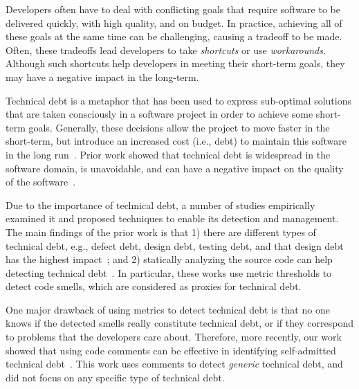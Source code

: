 
Developers often have to deal with conflicting goals that require software to be delivered quickly, with high quality, and on budget. In practice, achieving all of these goals at the same time can be challenging, causing a tradeoff to be made. Often, these tradeoffs lead developers to take \emph{shortcuts} or use \emph{workarounds}. Although such shortcuts help developers in meeting their short-term goals, they may have a negative impact in the long-term.

Technical debt is a metaphor that has been used to express sub-optimal solutions that are taken consciously in a software project in order to achieve some short-term goals. Generally, these decisions allow the project to move faster in the short-term, but introduce an increased cost (i.e., debt) to maintain this software in the long run~\cite{Seaman2011,Kruchten2013IWMTD}. Prior work showed that technical debt is widespread in the software domain, is unavoidable, and can have a negative impact on the quality of the software~\cite{Lim2012Software}.

Due to the importance of technical debt, a number of studies empirically examined it and proposed techniques to enable its detection and management. The main findings of the prior work is that 1) there are different types of technical debt, e.g., defect debt, design debt, testing debt, and that design debt has the highest impact~\cite{Alves2014MTD,Marinescu2012IBM}; and 2) statically analyzing the source code can help detecting technical debt~\cite{Marinescu2004ICSM,Marinescu2010CSMR,Zazworka2013CSE}. In particular, these works use metric thresholds to detect code smells, which are considered as proxies for technical debt. 

One major drawback of using metrics to detect technical debt is that no one knows if the detected smells really constitute technical debt, or if they correspond to problems that the developers care about. Therefore, more recently, our work showed that using code comments can be effective in identifying self-admitted technical debt~\cite{Potdar2014ICSME}. This work uses comments to detect \emph{generic} technical debt, and did not focus on any specific type of technical debt.


